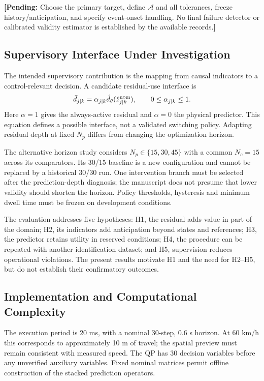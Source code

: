 \documentclass[10pt,journal]{IEEEtran}
\newcommand{\pending}[1]{\par\smallskip\noindent\textbf{[Pending:} #1\textbf{]}\par\smallskip}
\begin{document}
\pending{Choose the primary target, define $\mathcal A$ and all tolerances, freeze history/anticipation, and specify event-onset handling. No final failure detector or calibrated validity estimator is established by the available records.}

\subsection{Supervisory Interface Under Investigation}
The intended supervisory contribution is the mapping from causal indicators to a control-relevant decision. A candidate residual-use interface is
\begin{equation}
 \bar d_{j|k}=\alpha_{j|k}\hat d_\theta(\hat z^{\rm nom}_{j|k}),
 \qquad 0\leq\alpha_{j|k}\leq1.
\end{equation}
Here $\alpha=1$ gives the always-active residual and $\alpha=0$ the physical predictor. This equation defines a possible interface, not a validated switching policy. Adapting residual depth at fixed $N_p$ differs from changing the optimization horizon.

The alternative horizon study considers $N_p\in\{15,30,45\}$ with a common $N_c=15$ across its comparators. Its 30/15 baseline is a new configuration and cannot be replaced by a historical 30/30 run. One intervention branch must be selected after the prediction-depth diagnosis; the manuscript does not presume that lower validity should shorten the horizon. Policy thresholds, hysteresis and minimum dwell time must be frozen on development conditions.

The evaluation addresses five hypotheses: H1, the residual adds value in part of the domain; H2, its indicators add anticipation beyond states and references; H3, the predictor retains utility in reserved conditions; H4, the procedure can be repeated with another identification dataset; and H5, supervision reduces operational violations. The present results motivate H1 and the need for H2--H5, but do not establish their confirmatory outcomes.

\subsection{Implementation and Computational Complexity}
The execution period is 20 ms, with a nominal 30-step, 0.6 s horizon. At 60 km/h this corresponds to approximately 10 m of travel; the spatial preview must remain consistent with measured speed. The QP has 30 decision variables before any unverified auxiliary variables. Fixed nominal matrices permit offline construction of the stacked prediction operators.
\end{document}
